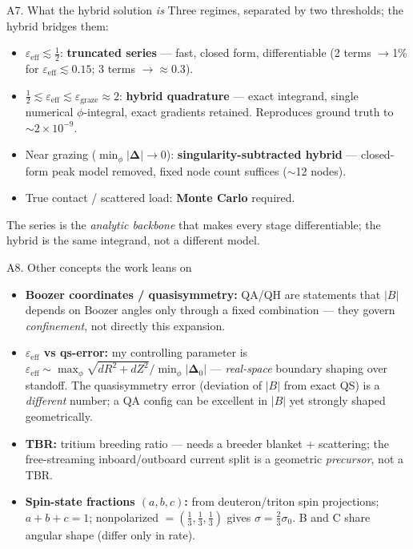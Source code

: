 \documentclass[aspectratio=169]{beamer}
\newcommand{\Del}{\bm{\Delta}}
\newcommand{\eps}{\varepsilon}
\begin{document}
\begin{frame}{A7. What the hybrid solution \emph{is}}
  \small
  Three regimes, separated by two thresholds; the hybrid bridges them:
  \begin{itemize}
    \item $\eps_{\mathrm{eff}}\lesssim\tfrac12$: \textbf{truncated series} --- fast, closed form,
      differentiable (2 terms $\to$1\% for $\eps_{\mathrm{eff}}\lesssim0.15$; 3 terms $\to\approx0.3$).
    \item $\tfrac12\lesssim\eps_{\mathrm{eff}}\lesssim\eps_{\mathrm{graze}}\!\approx\!2$:
      \textbf{hybrid quadrature} --- exact integrand, single numerical $\phi$-integral, exact
      gradients retained. Reproduces ground truth to $\sim2\times10^{-9}$.
    \item Near grazing ($\min_\phi|\Del|\!\to\!0$): \textbf{singularity-subtracted hybrid} ---
      closed-form peak model removed, fixed node count suffices ($\sim$12 nodes).
    \item True contact / scattered load: \textbf{Monte Carlo} required.
  \end{itemize}
  The series is the \emph{analytic backbone} that makes every stage differentiable; the hybrid is
  the same integrand, not a different model.
\end{frame}

\begin{frame}{A8. Other concepts the work leans on}
  \small
  \begin{itemize}
    \item \textbf{Boozer coordinates / quasisymmetry:} QA/QH are statements that $|B|$ depends on
      Boozer angles only through a fixed combination --- they govern \emph{confinement}, not directly
      this expansion.
    \item \textbf{$\eps_{\mathrm{eff}}$ vs qs-error:} my controlling parameter is
      $\eps_{\mathrm{eff}}\sim\max_\phi\sqrt{dR^2+dZ^2}/\min_\phi|\Del_0|$ --- \emph{real-space} boundary
      shaping over standoff. The quasisymmetry error (deviation of $|B|$ from exact QS) is a
      \emph{different} number; a QA config can be excellent in $|B|$ yet strongly shaped geometrically.
    \item \textbf{TBR:} tritium breeding ratio --- needs a breeder blanket + scattering; the
      free-streaming inboard/outboard current split is a geometric \emph{precursor}, not a TBR.
    \item \textbf{Spin-state fractions $(a,b,c)$:} from deuteron/triton spin projections;
      $a{+}b{+}c{=}1$; nonpolarized $=(\tfrac13,\tfrac13,\tfrac13)$ gives $\sigma=\tfrac23\sigma_0$.
      B and C share angular shape (differ only in rate).
  \end{itemize}
\end{frame}
\end{document}
